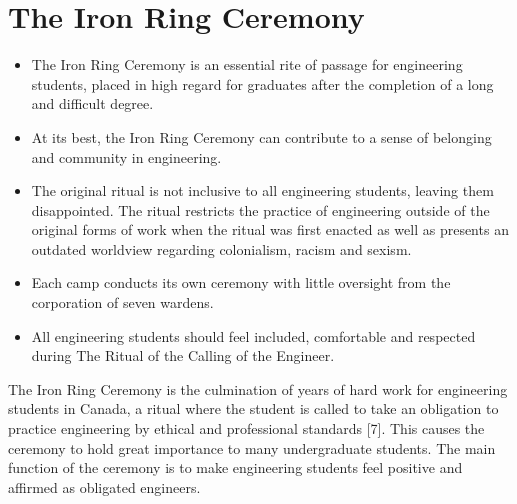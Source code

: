 \section{The Iron Ring Ceremony}\label{the-iron-ring-ceremony}



\begin{itemize}
 \item The Iron Ring Ceremony is an essential rite of passage for engineering students, placed in high regard for graduates after the completion of a long and difficult degree.
 \item At its best, the Iron Ring Ceremony can contribute to a sense of belonging and community in engineering.
 \item The original ritual is not inclusive to all engineering students, leaving them disappointed. The ritual restricts the practice of engineering outside of the original forms of work when the ritual was first enacted as well as presents an outdated worldview regarding colonialism, racism and sexism.
 \item Each camp conducts its own ceremony with little oversight from the corporation of seven wardens.
 \item All engineering students should feel included, comfortable and respected during The Ritual of the Calling of the Engineer.
\end{itemize}


The Iron Ring Ceremony is the culmination of years of hard work for engineering students in Canada, a ritual where the student is called to take an obligation to practice engineering by ethical and professional standards [7]. This causes the ceremony to hold great importance to many undergraduate students. The main function of the ceremony is to make engineering students feel positive and affirmed as obligated engineers.

